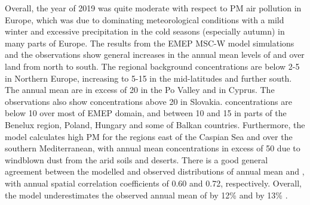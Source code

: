 Overall, the year of 2019 was quite moderate with respect to PM air pollution in Europe, which was due to dominating meteorological conditions with a mild winter and excessive precipitation in the cold seasons (especially autumn) in many parts of Europe. %
The results from the EMEP MSC-W model simulations and the observations show general increases in the annual mean levels of \PM[10] and \PM[2.5] over land from north to south. The regional background concentrations are below 2-5 \ug in Northern Europe, increasing to 5-15 \ug in the mid-latitudes and further south. The annual mean \PM[10] are in excess of 20 \ug in the Po Valley and in Cyprus. The observations also show \PM[10] concentrations above 20 \ug in Slovakia. \PM[2.5] concentrations are below 10 \ug over most of EMEP domain, and between 10 and 15 \ug in parts of the Benelux region, Poland, Hungary and some of Balkan countries. Furthermore, the model calculates high PM for the regions east of the Caspian Sea and over the southern Mediterranean, with annual mean concentrations in excess of 50 \ug due to windblown dust from the arid soils and deserts. There is a good general agreement between the modelled and observed distributions of annual mean \PM[10] and \PM[2.5], with annual spatial correlation coefficients of 0.60 and 0.72, respectively. Overall, the model underestimates the observed annual mean of \PM[10] by 12\% and \PM[2.5] by 13\% .

